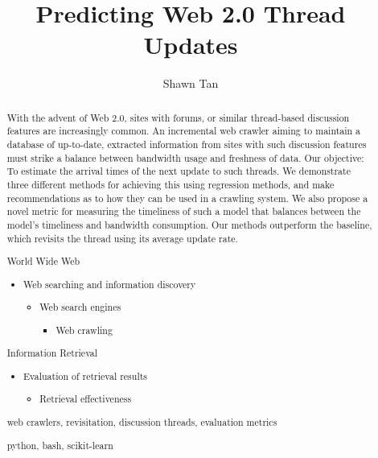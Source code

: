 \documentclass[hyp,12pt]{socreport}
\begin{document}

\title{Predicting Web 2.0 Thread Updates}
\author{Shawn Tan}
\maketitle
\begin{abstract}
With the advent of Web 2.0, sites with forums, or similar thread-based
discussion features are increasingly common. An incremental web crawler aiming 
to maintain a database of up-to-date, extracted information from sites with such 
discussion features must strike a balance between bandwidth usage and freshness 
of data. Our objective: To estimate the arrival times of the next update to such 
threads. We demonstrate three different methods for achieving this using 
regression methods, and make recommendations as to how they can be used in a 
crawling system. We also propose a novel metric for measuring the timeliness of 
such a model that balances between the model's timeliness and bandwidth 
consumption. Our methods outperform the baseline, which revisits the thread 
using its average update rate.

\begin{descriptors}
\item World Wide Web
	\begin{itemize}
	\item[] Web searching and information discovery
		\begin{itemize}
		\item[] Web search engines
			\begin{itemize}
			\item[] Web crawling
			\end{itemize}
		\end{itemize}
	\end{itemize}
	\item[] Information Retrieval
		\begin{itemize}
		\item[] Evaluation of retrieval results
			\begin{itemize}
			\item[] Retrieval effectiveness
			\end{itemize}
		\end{itemize}
\end{descriptors}
\begin{keywords}
	web crawlers, revisitation, discussion threads, evaluation metrics
\end{keywords}
\begin{implement}
	python, bash, scikit-learn\nocite{scikit-learn}
\end{implement}
\end{abstract}
\end{document}
